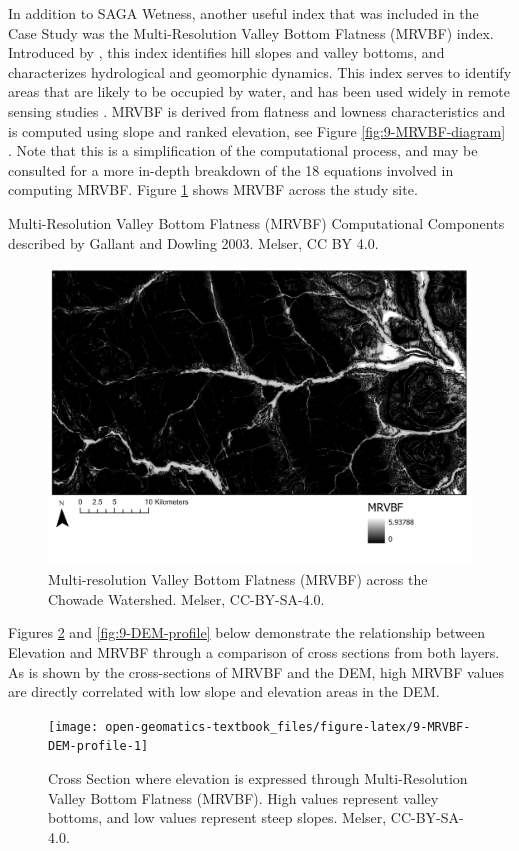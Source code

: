 \documentclass[
]{book}
\begin{document}
In addition to SAGA Wetness, another useful index that was included in the Case Study was the Multi-Resolution Valley Bottom Flatness (MRVBF) index. Introduced by \citep{gallant2003multiresolution}, this index identifies hill slopes and valley bottoms, and characterizes hydrological and geomorphic dynamics. This index serves to identify areas that are likely to be occupied by water, and has been used widely in remote sensing studies \citep{huang2017comparison}. MRVBF is derived from flatness and lowness characteristics and is computed using slope and ranked elevation, see Figure \ref{fig:9-MRVBF-diagram} \citep{gallant2003multiresolution}. Note that this is a simplification of the computational process, and \citep{gallant2003multiresolution} may be consulted for a more in-depth breakdown of the 18 equations involved in computing MRVBF. Figure \ref{fig:9-MRVBF} shows MRVBF across the study site.

\label{fig:9-MRVBF-diagram}Multi-Resolution Valley Bottom Flatness (MRVBF) Computational Components described by Gallant and Dowling 2003. Melser, CC BY 4.0.

\begin{figure}
\includegraphics[width=0.75\linewidth]{images/09-MRVBF} \caption{Multi-resolution Valley Bottom Flatness (MRVBF) across the Chowade Watershed. Melser, CC-BY-SA-4.0.}\label{fig:9-MRVBF}
\end{figure}

Figures \ref{fig:9-MRVBF-DEM-profile} and \ref{fig:9-DEM-profile} below demonstrate the relationship between Elevation and MRVBF through a comparison of cross sections from both layers. As is shown by the cross-sections of MRVBF and the DEM, high MRVBF values are directly correlated with low slope and elevation areas in the DEM.

\begin{figure}
\texttt{[image: open-geomatics-textbook\_files/figure-latex/9-MRVBF-DEM-profile-1]} \caption{Cross Section where elevation is expressed through Multi-Resolution Valley Bottom Flatness (MRVBF). High values represent valley bottoms, and low values represent steep slopes. Melser, CC-BY-SA-4.0.}\label{fig:9-MRVBF-DEM-profile}
\end{figure}
\end{document}
